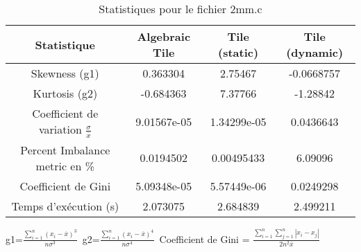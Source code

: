 \documentclass{article}
\begin{document}
\begin{table}[htbp]
  \centering
  \caption{Statistiques pour le fichier 2mm.c}
  \begin{tabular}{|c|c|c|c|}
    \hline
    Statistique & Algebraic Tile & Tile (static) & Tile (dynamic) \\ 
    \hline
    Skewness (g1)  & 0.363304 & 2.75467 & -0.0668757 \\ 
    Kurtosis (g2)  & -0.684363 & 7.37766 & -1.28842 \\ 
    Coefficient de variation $ \frac{\sigma}{\overline{x}} $ & 9.01567e-05 & 1.34299e-05 & 0.0436643\\ 
    Percent Imbalance metric en \% & 0.0194502 & 0.00495433 & 6.09096\\ 
    Coefficient de Gini  & 5.09348e-05 & 5.57449e-06 & 0.0249298\\ 
    Temps d'exécution (s) &  2.073075    &  2.684839   &  2.499211   \\ 

    \hline
  \end{tabular}
\end{table}\newline
g1=$ \frac{\sum_{i=1}^{n} (x_i - \overline{x})^3}{n\sigma^3} $\
g2=$ \frac{\sum_{i=1}^{n} (x_i - \overline{x})^4}{n\sigma^4} $\
Coefficient de Gini = $ \frac{\sum_{i=1}^{n}\sum_{j=1}^{n} |x_i - x_j|}{2n^2\overline{x}} $\
\newpage
\end{document}
